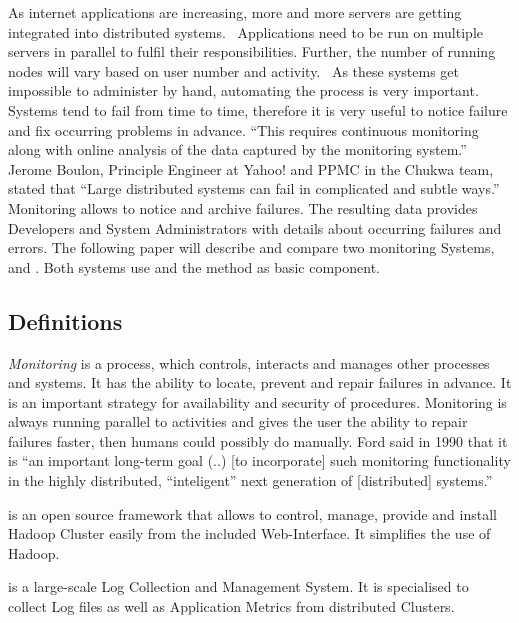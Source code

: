 As internet applications are increasing, more and more servers are getting integrated into distributed systems.~\cite{Dinu2011} Applications need to be run on multiple servers in parallel to fulfil their responsibilities. 
Further, the number of running nodes will vary based on user number and activity.~\cite{Jammes2012} 
As these systems get impossible to administer by hand, automating the process is very important.~\cite{Jammes2012} 
Systems tend to fail from time to time, therefore it is very useful to notice failure and fix occurring problems in advance. 
``This requires continuous monitoring along with online analysis of the data captured by the monitoring system.''~\cite{Kutare2010}
Jerome Boulon, Principle Engineer at Yahoo! and PPMC in the Chukwa team, stated that ``Large distributed systems can fail in complicated and subtle ways.''~\cite{Boulonb} 
Monitoring allows to notice and archive failures. 
The resulting data provides Developers and System Administrators with details about occurring failures and errors. 
The following paper will describe and compare two monitoring Systems, \amb and \chuk. 
Both systems use \hadoop and the \mr method as basic component.\cite{ApacheSoftwareFoundation2015}


\subsection{Definitions}

\textit{Monitoring} is a process, which controls, interacts and manages other processes and systems. 
It has the ability to locate, prevent and repair failures in advance. 
It is an important strategy for availability and security of procedures. 
Monitoring is always running parallel to activities and gives the user the ability to repair failures faster, then humans could possibly do manually.\cite{Jammes2012}
Ford said in 1990 that it is ``an important long-term goal (..) [to incorporate] such monitoring functionality in the highly distributed, ``inteligent'' next generation of [distributed] systems.''~\cite{Ford1990}

\amb is an open source framework that allows to control, manage, provide and install Hadoop Cluster easily from the included Web-Interface. It simplifies the use of Hadoop.\cite{Hortonworks2013}

\chuk is a large-scale Log Collection and Management System. It is specialised to collect Log files as well as Application Metrics from distributed Clusters.


